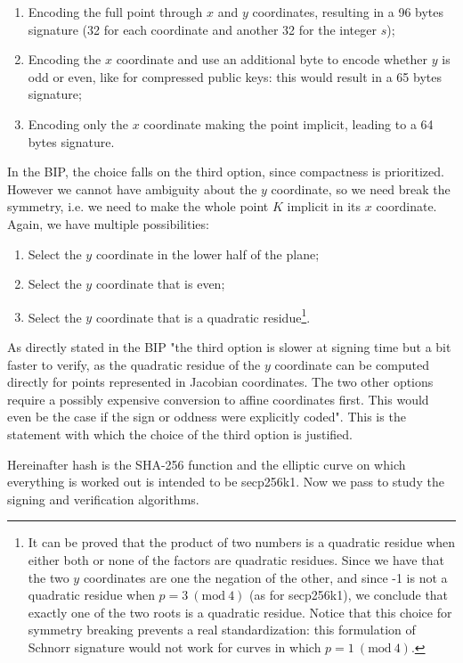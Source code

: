 \begin{enumerate}
	\item Encoding the full point through $x$ and $y$ coordinates, resulting in a 96 bytes signature (32 for each coordinate and another 32 for the integer $s$);
	\item Encoding the $x$ coordinate and use an additional byte to encode whether $y$ is odd or even, like for compressed public keys: this would result in a 65 bytes signature;
	\item Encoding only the $x$ coordinate making the point implicit, leading to a 64 bytes signature.
\end{enumerate}
In the BIP, the choice falls on the third option, since compactness is prioritized. However we cannot have ambiguity about the $y$ coordinate, so we need break the symmetry, i.e. we need to make the whole point $K$ implicit in its $x$ coordinate. Again, we have multiple possibilities:
\begin{enumerate}
	\item Select the $y$ coordinate in the lower half of the plane;
	\item Select the $y$ coordinate that is even;
	\item Select the $y$ coordinate that is a quadratic residue\footnote{It can be proved that the product of two numbers is a quadratic residue when either both or none of the factors are quadratic residues. Since we have that the two $y$ coordinates are one the negation of the other, and since -1 is not a quadratic residue when $p = 3 \ (\text{mod} \ 4)$ (as for secp256k1), we conclude that exactly one of the two roots is a quadratic residue. Notice that this choice for symmetry breaking prevents a real standardization: this formulation of Schnorr signature would not work for curves in which $p = 1 \ (\text{mod} \ 4)$.}.
\end{enumerate}
As directly stated in the BIP "the third option is slower at signing time but a bit faster to verify, as the quadratic residue of the $y$ coordinate can be computed directly for points represented in Jacobian coordinates. The two other options require a possibly expensive conversion to affine coordinates first. This would even be the case if the sign or oddness were explicitly coded". This is the statement with which the choice of the third option is justified.

\bigskip
\noindent
Hereinafter hash is the SHA-256 function and the elliptic curve on which everything is worked out is intended to be secp256k1. Now we pass to study the signing and verification algorithms. 

